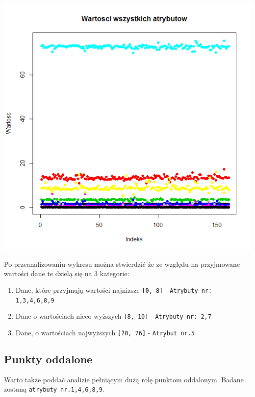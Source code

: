\documentclass[a4paper,12pt,twoside]{article}
\begin{document}
\begin{center}
\includegraphics[width=.90\textwidth]{img/3_wszystkie_dane.png}
\end{center}

Po przeanalizowaniu wykresu można stwierdzić że ze względu na przyjmowane wartości dane te dzielą się
na 3 kategorie:

\begin{enumerate}
\item Dane, które przyjmują wartości najnizsze \texttt{\~[0, 8]} - \texttt{Atrybuty nr: 1,3,4,6,8,9}
\item Dane o wartościach nieco wyższych \texttt{\~[8, 10]} - \texttt{Atrybuty nr: 2,7}
\item Dane, o wartościach najwyższych \texttt{\~[70, 76]} - \texttt{Atrybut nr.5}
\end{enumerate}

\subsection{Punkty oddalone}

Warto także poddać analizie pełniącym dużą rolę punktom oddalonym. Badane zostaną \texttt{atrybuty nr.1,4,6,8,9}.
\end{document}
